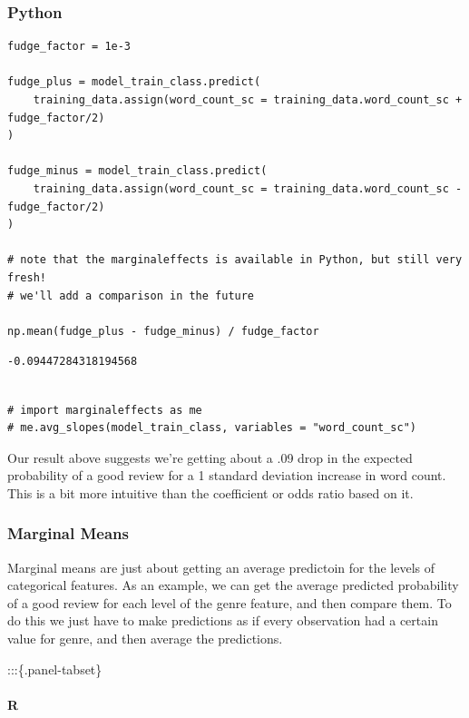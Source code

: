 \documentclass[
  letterpaper,
]{krantz}
\let\oldparagraph\paragraph
\renewcommand{\paragraph}[1]{\oldparagraph{#1}\mbox{}}
\begin{document}
\subsubsection{Python}

\begin{verbatim}
fudge_factor = 1e-3

fudge_plus = model_train_class.predict(
    training_data.assign(word_count_sc = training_data.word_count_sc + fudge_factor/2)
)

fudge_minus = model_train_class.predict(
    training_data.assign(word_count_sc = training_data.word_count_sc - fudge_factor/2)
)

# note that the marginaleffects is available in Python, but still very fresh!
# we'll add a comparison in the future

np.mean(fudge_plus - fudge_minus) / fudge_factor
\end{verbatim}

\begin{verbatim}
-0.09447284318194568
\end{verbatim}

\begin{verbatim}

# import marginaleffects as me
# me.avg_slopes(model_train_class, variables = "word_count_sc")
\end{verbatim}

Our result above suggests we're getting about a .09 drop in the expected
probability of a good review for a 1 standard deviation increase in word
count. This is a bit more intuitive than the coefficient or odds ratio
based on it.

\subsubsection{Marginal Means}\label{marginal-means}

Marginal means are just about getting an average predictoin for the
levels of categorical features. As an example, we can get the average
predicted probability of a good review for each level of the genre
feature, and then compare them. To do this we just have to make
predictions as if every observation had a certain value for genre, and
then average the predictions.

:::\{.panel-tabset\}

\paragraph{R}\label{r-31}
\end{document}
